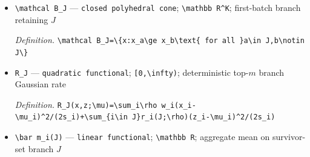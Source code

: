 \documentclass{article}
\begin{document}
\begin{itemize}
  \par\smallskip\noindent\emph{Definition.} \texttt{\textbackslash{}\allowbreak{}Gamma\_\allowbreak{}\{\textbackslash{}\allowbreak{}rho,\allowbreak{}w,\allowbreak{}m\}\allowbreak{}(\textbackslash{}\allowbreak{}mu)=\allowbreak{}\textbackslash{}\allowbreak{}lim\_\allowbreak{}\{T\textbackslash{}\allowbreak{}to\textbackslash{}\allowbreak{}infty\}\allowbreak{}-\allowbreak{}T\textasciicircum{}\{-\allowbreak{}1\}\allowbreak{}\textbackslash{}\allowbreak{}log\textbackslash{}\allowbreak{}mathbb P\_\allowbreak{}\{\textbackslash{}\allowbreak{}mu,\allowbreak{}s\}\allowbreak{}\textasciicircum{}\{\textbackslash{}\allowbreak{}rho,\allowbreak{}w,\allowbreak{}m\}\allowbreak{}(\textbackslash{}\allowbreak{}widehat h\_\allowbreak{}\{T,\allowbreak{}m\}\allowbreak{}\textbackslash{}\allowbreak{}ne h)\textbackslash{}\allowbreak{}text\{ when the limit exists\}\allowbreak{}}
  \item \texttt{\textbackslash{}\allowbreak{}mathcal B\_\allowbreak{}J} --- \texttt{closed polyhedral cone}; \texttt{\textbackslash{}\allowbreak{}mathbb R\textasciicircum{}K}; first-batch branch retaining \(J\)
  \par\smallskip\noindent\emph{Definition.} \texttt{\textbackslash{}\allowbreak{}mathcal B\_\allowbreak{}J=\allowbreak{}\textbackslash{}\allowbreak{}\{x:\allowbreak{}x\_\allowbreak{}a\textbackslash{}\allowbreak{}ge x\_\allowbreak{}b\textbackslash{}\allowbreak{}text\{ for all \}\allowbreak{}a\textbackslash{}\allowbreak{}in J,\allowbreak{}b\textbackslash{}\allowbreak{}notin J\textbackslash{}\allowbreak{}\}\allowbreak{}}
  \item \texttt{R\_\allowbreak{}J} --- \texttt{quadratic functional}; \texttt{[0,\allowbreak{}\textbackslash{}\allowbreak{}infty)}; deterministic top-\(m\) branch Gaussian rate
  \par\smallskip\noindent\emph{Definition.} \texttt{R\_\allowbreak{}J(x,\allowbreak{}z;\allowbreak{}\textbackslash{}\allowbreak{}mu)=\allowbreak{}\textbackslash{}\allowbreak{}sum\_\allowbreak{}i\textbackslash{}\allowbreak{}rho w\_\allowbreak{}i(x\_\allowbreak{}i-\allowbreak{}\textbackslash{}\allowbreak{}mu\_\allowbreak{}i)\textasciicircum{}2/\allowbreak{}(2s\_\allowbreak{}i)+\allowbreak{}\textbackslash{}\allowbreak{}sum\_\allowbreak{}\{i\textbackslash{}\allowbreak{}in J\}\allowbreak{}r\_\allowbreak{}i(J;\allowbreak{}\textbackslash{}\allowbreak{}rho)(z\_\allowbreak{}i-\allowbreak{}\textbackslash{}\allowbreak{}mu\_\allowbreak{}i)\textasciicircum{}2/\allowbreak{}(2s\_\allowbreak{}i)}
  \item \texttt{\textbackslash{}\allowbreak{}bar m\_\allowbreak{}i(J)} --- \texttt{linear functional}; \texttt{\textbackslash{}\allowbreak{}mathbb R}; aggregate mean on survivor-set branch \(J\)

\end{itemize}
\end{document}
